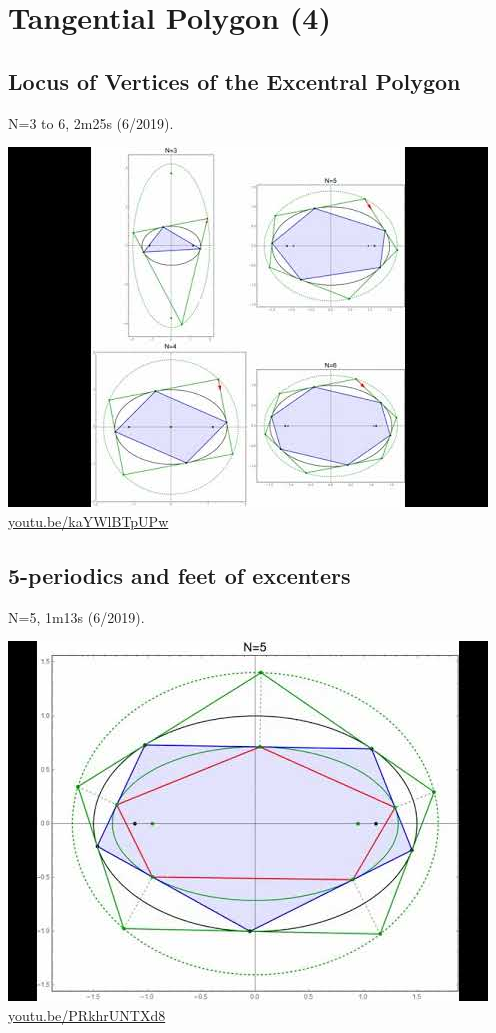\documentclass[12pt]{amsart}
\begin{document}
\section{Tangential Polygon (4)}

\subsection{Locus of Vertices of the Excentral Polygon}
\label{vid:kaYWlBTpUPw}
\noindent N=3 to 6, 2m25s (6/2019). 
\begin{center}\includegraphics[width=.5\textwidth]{pics/kaYWlBTpUPw.jpg} \\ 
\href{https://youtu.be/kaYWlBTpUPw}{\url{youtu.be/kaYWlBTpUPw}}\end{center}
% 
\subsection{5-periodics and feet of excenters}
\label{vid:PRkhrUNTXd8}
\noindent N=5, 1m13s (6/2019). 
\begin{center}\includegraphics[width=.5\textwidth]{pics/PRkhrUNTXd8.jpg} \\ 
\href{https://youtu.be/PRkhrUNTXd8}{\url{youtu.be/PRkhrUNTXd8}}\end{center}
% 
\end{document}
